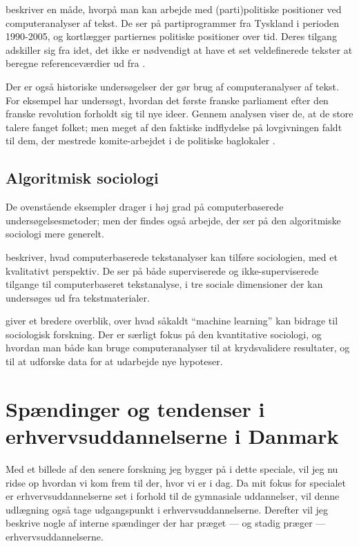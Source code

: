 \citeauthor{slapinScalingModelEstimating2008} beskriver en måde, hvorpå man kan arbejde med (parti)politiske positioner ved computeranalyser af tekst.
De ser på partiprogrammer fra Tyskland i perioden 1990-2005, og kortlægger partiernes politiske positioner over tid.
Deres tilgang adskiller sig fra \citeauthor{laverExtractingPolicyPositions2003} idet, det ikke er nødvendigt at have et set veldefinerede tekster at beregne referenceværdier ud fra \autocite{slapinScalingModelEstimating2008}.

Der er også historiske undersøgelser der gør brug af computeranalyser af tekst.
For eksempel har \citeauthor{barronIndividualsInstitutionsInnovation2018} undersøgt, hvordan det første franske parliament efter den franske revolution forholdt sig til nye ideer.
Gennem analysen viser de, at de store talere fanget folket; men meget af den faktiske indflydelse på lovgivningen faldt til dem, der mestrede komite-arbejdet i de politiske baglokaler \autocite{barronIndividualsInstitutionsInnovation2018}. 

\section{Algoritmisk sociologi}\label{sec:review-compsoc}
De ovenstående eksempler drager i høj grad på computerbaserede undersøgelsesmetoder; men der findes også arbejde, der ser på den algoritmiske sociologi mere generelt.

\cite{evansMachineTranslationMining2016} beskriver, hvad computerbaserede tekstanalyser kan tilføre sociologien, med et kvalitativt perspektiv.
De ser på både superviserede og ikke-superviserede tilgange til computerbaseret tekstanalyse, i tre sociale dimensioner der kan undersøges ud fra tekstmaterialer.

 \cite{molinaMachineLearningSociology2019} giver et bredere overblik, over hvad såkaldt “machine learning” kan bidrage til sociologisk forskning.
Der er særligt fokus på den kvantitative sociologi, og hvordan man både kan bruge computeranalyser til at krydsvalidere resultater, og til at udforske data for at udarbejde nye hypoteser.

\chapter{Spændinger og tendenser i erhvervsuddannelserne i Danmark}
Med et billede af den senere forskning jeg bygger på i dette speciale, vil jeg nu ridse op hvordan vi kom frem til der, hvor vi er i dag.
Da mit fokus for specialet er erhvervsuddannelserne set i forhold til de gymnasiale uddannelser, vil denne udlægning også tage udgangspunkt i erhvervsuddannelserne.
Derefter vil jeg beskrive nogle af interne spændinger der har præget — og stadig præger — erhvervsuddannelserne.

